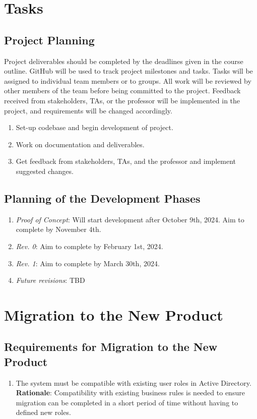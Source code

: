 \documentclass[12pt]{article}
\begin{document}
\section{Tasks}
\subsection{Project Planning}
Project deliverables should be completed by the deadlines given in the course outline.
 GitHub will be used to track project milestones and tasks. Tasks will be assigned
 to individual team members or to groups. All work will be reviewed by other members
 of the team before being committed to the project. Feedback received from stakeholders,
 TAs, or the professor will be implemented in the project, and requirements will
 be changed accordingly.
\begin{enumerate} [{Task }1.]
  \item Set-up codebase and begin development of project.
  \item Work on documentation and deliverables.
  \item Get feedback from stakeholders, TAs, and the professor and implement
   suggested changes.
  \end{enumerate}

\subsection{Planning of the Development Phases}
\begin{enumerate} 
  \item \textit{Proof of Concept}: Will start development after October 9th, 2024.
   Aim to complete by November 4th. 
  \item \textit{Rev. 0}: Aim to complete by February 1st, 2024.
  \item \textit{Rev. 1}: Aim to complete by March 30th, 2024.
  \item \textit{Future revisions}: TBD
\end{enumerate}

\section{Migration to the New Product}
\subsection{Requirements for Migration to the New Product}
\begin{enumerate} [{MI-NP}1.]
  \item The system must be compatible with existing user roles in Active
    Directory.\\
    \textbf{Rationale}: Compatibility with existing business rules is needed
    to ensure migration can be completed in a short period of time without
    having to defined new roles.
\end{enumerate}
\end{document}
